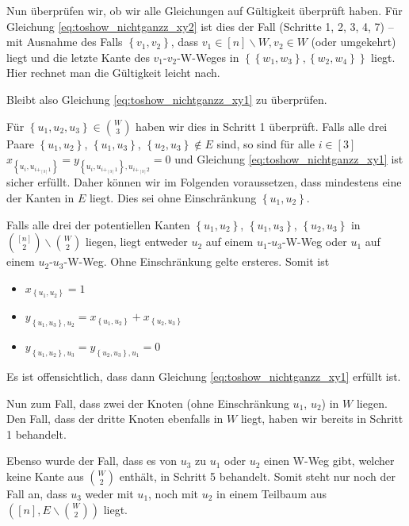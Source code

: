 \documentclass[10p,a4paper,BCOR = 12mm, DIV=15]{scrbook}
\begin{document}
{\begin{bew}
Nun überprüfen wir, ob wir alle Gleichungen auf Gültigkeit überprüft haben. Für Gleichung \eqref{eq:toshow_nichtganzz_xy2} ist dies der Fall (Schritte 1, 2, 3, 4, 7) -- mit Ausnahme des Falls $\left\{v_1, v_2\right\}$, dass $v_1 \in  \left[n\right] \backslash W, v_2 \in W$ (oder umgekehrt) liegt und die letzte Kante des $v_1$-$v_2$-W-Weges in $\left\{\left\{w_1, w_3\right\}, \left\{w_2, w_4\right\}\right\}$ liegt. Hier rechnet man die Gültigkeit leicht nach.

Bleibt also Gleichung \eqref{eq:toshow_nichtganzz_xy1} zu überprüfen.

Für $\left\{u_1, u_2, u_3\right\} \in {W \choose 3}$ haben wir dies in Schritt 1 überprüft. Falls alle drei Paare $\left\{u_1, u_2\right\}$, $\left\{u_1, u_3\right\}$, $\left\{u_2, u_3\right\} \notin E$ sind, so sind für alle $i \in \left[3\right]$ $x_{\left\{u_i, u_{i +_{[3]} 1}\right\}} = y_{\left\{u_i, u_{i +_{[3]} 1}\right\}, u_{i +_{[3]} 2}} = 0$ und Gleichung \eqref{eq:toshow_nichtganzz_xy1} ist sicher erfüllt. Daher können wir im Folgenden voraussetzen, dass mindestens eine der Kanten in $E$ liegt. Dies sei ohne Einschränkung $\left\{u_1, u_2\right\}$.

Falls alle drei der potentiellen Kanten $\left\{u_1, u_2\right\}$, $\left\{u_1, u_3\right\}$, $\left\{u_2, u_3\right\}$ in ${\left[n\right] \choose 2} \backslash {W \choose 2}$ liegen, liegt entweder $u_2$ auf einem $u_1$-$u_3$-W-Weg oder $u_1$ auf einem $u_2$-$u_3$-W-Weg. Ohne Einschränkung gelte ersteres. Somit ist
\begin{itemize}
\item $x_{\left\{u_1, u_2\right\}} = 1$
\item $y_{\left\{u_1, u_3\right\}, u_2} = x_{\left\{u_1, u_2\right\}} + x_{\left\{u_2, u_3\right\}}$
\item $y_{\left\{u_1, u_2\right\}, u_3} = y_{\left\{u_2, u_3\right\}, u_1} = 0$
\end{itemize}
Es ist offensichtlich, dass dann Gleichung \eqref{eq:toshow_nichtganzz_xy1} erfüllt ist.

Nun zum Fall, dass zwei der Knoten (ohne Einschränkung $u_1$, $u_2$) in $W$ liegen. Den Fall, dass der dritte Knoten ebenfalls in $W$ liegt, haben wir bereits in Schritt 1 behandelt.

Ebenso wurde der Fall, dass es von $u_3$ zu $u_1$ oder $u_2$ einen W-Weg gibt, welcher keine Kante aus $W \choose 2$ enthält, in Schritt 5 behandelt. Somit steht nur noch der Fall an, dass $u_3$ weder mit $u_1$, noch mit $u_2$ in einem Teilbaum aus $\left(\left[n\right], E \backslash {W \choose 2}\right)$ liegt.


\end{bew}}
\end{document}
